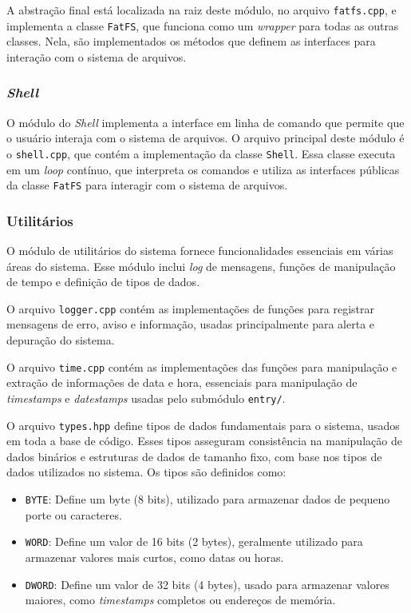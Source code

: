 \documentclass[
    12pt,				%
    oneside,   	        %
    a4paper,			%
    english,			%
    french,				%
    spanish,			%
    brazil,				%
    ]{pacotes/abntex2}
\begin{document}
A abstração final está localizada na raiz deste módulo, no arquivo \texttt{fatfs.cpp}, e implementa a classe \texttt{FatFS}, que funciona como um \textit{wrapper} para todas as outras classes. Nela, são implementados os métodos que definem as interfaces para interação com o sistema de arquivos.

\subsubsection{\textit{Shell}}
\label{subsubsec:shell}

O módulo do \textit{Shell} implementa a interface em linha de comando que permite que o usuário interaja com o sistema de arquivos. O arquivo principal deste módulo é o \texttt{shell.cpp}, que contém a implementação da classe \texttt{Shell}. Essa classe executa em um \textit{loop} contínuo, que interpreta os comandos e utiliza as interfaces públicas da classe \texttt{FatFS} para interagir com o sistema de arquivos.

\subsubsection{Utilitários}
\label{subsubsec:utils}

O módulo de utilitários do sistema fornece funcionalidades essenciais em várias áreas do sistema. Esse módulo inclui \textit{log} de mensagens, funções de manipulação de tempo e definição de tipos de dados.

O arquivo \texttt{logger.cpp} contém as implementações de funções para registrar mensagens de erro, aviso e informação, usadas principalmente para alerta e depuração do sistema.

O arquivo \texttt{time.cpp} contém as implementações das funções para manipulação e extração de informações de data e hora, essenciais para manipulação de \textit{timestamps} e \textit{datestamps} usadas pelo submódulo \texttt{entry/}.

O arquivo \texttt{types.hpp} define tipos de dados fundamentais para o sistema, usados em toda a base de código. Esses tipos asseguram consistência na manipulação de dados binários e estruturas de dados de tamanho fixo, com base nos tipos de dados utilizados no sistema. Os tipos são definidos como:

\begin{itemize}
    \item \texttt{BYTE}: Define um byte (8 bits), utilizado para armazenar dados de pequeno porte ou caracteres.
    
    \item \texttt{WORD}: Define um valor de 16 bits (2 bytes), geralmente utilizado para armazenar valores mais curtos, como datas ou horas.
    
    \item \texttt{DWORD}: Define um valor de 32 bits (4 bytes), usado para armazenar valores maiores, como \textit{timestamps} completos ou endereços de memória.
\end{itemize}
\end{document}
